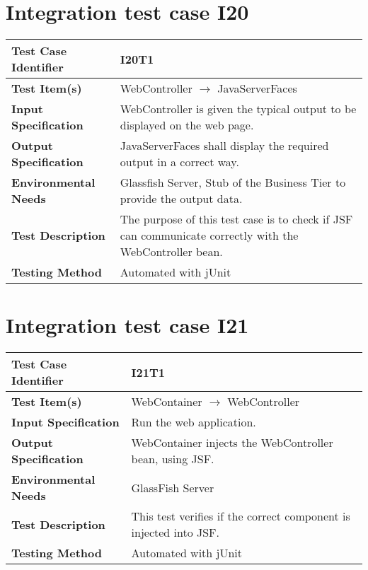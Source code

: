 \vspace{2em}

\section{Integration test case I20}

\begin{tabular}{l p{}}
    \hline
    \textbf{Test Case Identifier} & I20T1\\
    \hline
    \textbf{Test Item(s)} & WebController $\rightarrow$ JavaServerFaces \\
    \hline
    \textbf{Input Specification} & WebController is given the typical output to be displayed on the web page.\\
    \hline
    \textbf{Output Specification} & JavaServerFaces shall display the required output in a correct way.\\
    \hline
    \textbf{Environmental Needs} & Glassfish Server, Stub of the Business Tier to provide the output data. \\
    \hline
    \textbf{Test Description} & The purpose of this test case is to check if JSF can communicate correctly with the WebController bean.\\
    \hline
    \textbf{Testing Method} & Automated with jUnit \\
    \hline
\end{tabular}

\vspace{2em}

\section{Integration test case I21}

\begin{tabular}{l p{}}
    \hline
    \textbf{Test Case Identifier} & I21T1\\
    \hline
    \textbf{Test Item(s)} & WebContainer $\rightarrow$ WebController \\
    \hline
    \textbf{Input Specification} & Run the web application.\\
    \hline
    \textbf{Output Specification} & WebContainer injects the WebController bean, using JSF.\\
    \hline
    \textbf{Environmental Needs} & GlassFish Server\\
    \hline
    \textbf{Test Description} & This test verifies if the correct component is injected into JSF.\\
    \hline
    \textbf{Testing Method} & Automated with jUnit \\
    \hline
\end{tabular}
